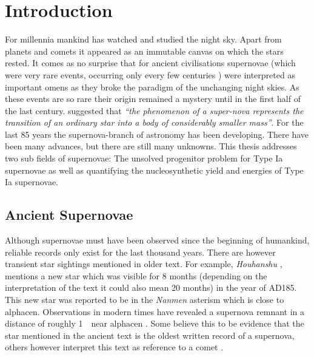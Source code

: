 \chapter{Introduction}
\label{chap:intro}

For millennia mankind has watched and studied the night sky. Apart from planets and comets it appeared as an immutable canvas on which the stars rested. It comes as no surprise that for ancient civilisations supernovae (which were very rare events, occurring only every few centuries ) were interpreted as important omens as they broke the paradigm of the unchanging night skies. As these events are so rare their origin remained a mystery until in the first half of the last century. \citet{1934PNAS...20..254B} suggested that \textit{``the phenomenon of a super-nova represents the transition of an ordinary star into a body of considerably smaller mass''}. For the last 85 years the supernova-branch of astronomy has been developing. There have been many advances, but there are still many unknowns. This thesis addresses two sub fields of supernovae: The unsolved progenitor problem for Type Ia supernovae as well as quantifying the nucleosynthetic yield and energies of Type Ia supernovae.


\section{Ancient Supernovae}
\label{sec:ancientsn}
Although supernovae must have been observed since the beginning of humankind, reliable records only exist for the last thousand years. There are however transient star sightings mentioned in older text. For example, \textit{Houhanshu} \citep{2006ChJAA...6..635Z}, mentions a new star which was visible for 8 months (depending on the interpretation of the text it could also mean 20 months) in the year of AD185. This new star was reported to be in the \textit{Nanmen} asterism which is close to \gls{alphacen}.  Observations in modern times have revealed a supernova remnant in a distance of roughly 1~\kpc\ near \gls{alphacen} \citep{2006ChJAA...6..635Z}. Some believe this to be evidence that the star mentioned in the ancient text is  the oldest written record of a supernova, others however interpret this text as reference to a comet \citep{1994Natur.371..398C}. 

